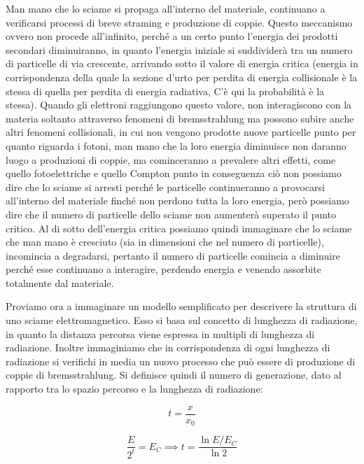 {Man mano che lo sciame si propaga all'interno del materiale, continuano a verificarsi processi di breve straming e produzione di coppie. Questo meccanismo ovvero non procede all'infinito, perché a un certo punto l'energia dei prodotti secondari diminuiranno, in quanto l'energia iniziale si suddividerà tra un numero di particelle di via crescente, arrivando sotto il valore di energia critica (energia in corrispondenza della quale la sezione d'urto per perdita di energia collisionale è la stessa di quella per perdita di energia radiativa, C'è qui la probabilità è la stessa). Quando gli elettroni raggiungono questo valore, non interagiscono con la materia soltanto attraverso fenomeni di bremsstrahlung ma possono subire anche altri fenomeni collisionali, in cui non vengono prodotte nuove particelle punto per quanto riguarda i fotoni, man mano che la loro energia diminuisce non daranno luogo a produzioni di coppie, ma cominceranno a prevalere altri effetti, come quello fotoelettriche e quello Compton punto in conseguenza ciò non possiamo dire che lo sciame si arresti perché le particelle continueranno a provocarsi all'interno del materiale finché non perdono tutta la loro energia, però possiamo dire che il numero di particelle dello sciame non aumenterà superato il punto critico. Al di sotto dell'energia critica possiamo quindi immaginare che lo sciame che man mano è cresciuto (sia in dimensioni che nel numero di particelle), incomincia a degradarsi, pertanto il numero di particelle comincia a diminuire perché esse continuano a interagire, perdendo energia e venendo assorbite totalmente dal materiale.

Proviamo ora a immaginare un modello semplificato per descrivere la struttura di uno sciame elettromagnetico. Esso si basa sul concetto di lunghezza di radiazione, in quanto la distanza percorsa viene espressa in multipli di lunghezza di radiazione. Inoltre immaginiamo che in corrispondenza di ogni lunghezza di radiazione si verifichi in media un nuovo processo che può essere di produzione di coppie di bremsstrahlung. Si definisce quindi il numero di generazione, dato al rapporto tra lo spazio percorso e la lunghezza di radiazione:

\begin{equation*}
    t=\frac{x}{x_0}
\end{equation*}

\begin{equation*}
    \frac{E}{2^t}=E_C
    \implies
    t=\frac{\ln{E/E_C}}{\ln{2}}
\end{equation*}

}
